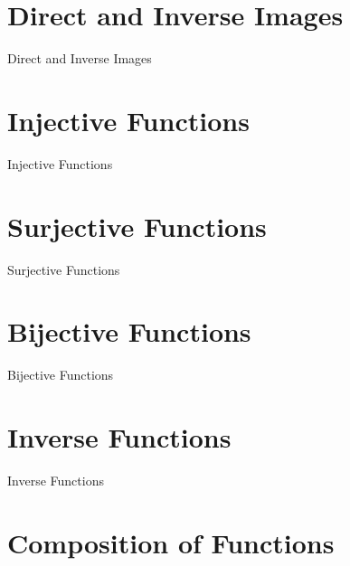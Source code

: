 \section{Direct and Inverse Images}
\label{sec:direct-and-inverse-images}

Direct and Inverse Images

\section{Injective Functions}
\label{sec:injective-functions}

Injective Functions

\section{Surjective Functions}
\label{sec:surjective-functions}

Surjective Functions

\section{Bijective Functions}
\label{sec:bijective-functions}

Bijective Functions

\section{Inverse Functions}
\label{sec:inverse-functions}

Inverse Functions

\section{Composition of Functions}
\label{sec:composition-of-functions}


